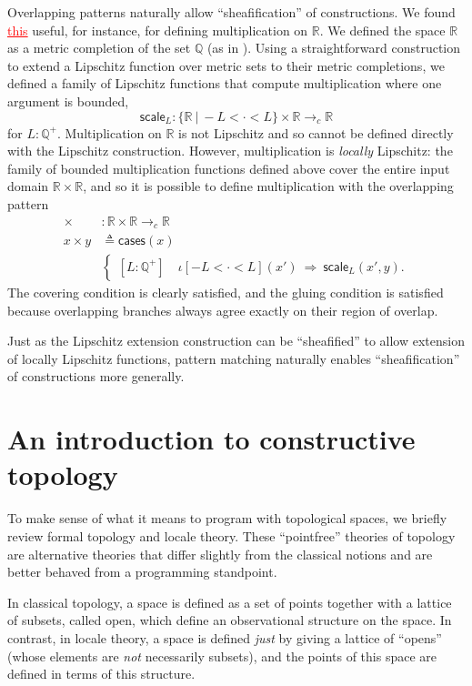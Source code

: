 \documentclass[conference]{IEEEtran}
\newcommand{\cto}{\to_c}
\newcommand{\R}{\mathbb{R}}
\newcommand{\rat}{\mathbb{Q}}
\newcommand{\suchthat}{\ |\ }
\newcommand{\oinclf}[1]{\iota[{#1}]}
\newcommand{\oincl}[2]{\oinclf{#1} \left({#2}\right)}
\newcommand{\Branch}{\Rightarrow}
\newcommand{\grammar}[1]{\textcolor{red}{\underline{#1}}}
\begin{document}
Overlapping patterns naturally allow ``sheafification'' of constructions. We found \grammar{this} useful, for instance, for defining multiplication on $\R$. We defined the space $\R$ as a metric completion of the set $\rat$ (as in \cite{vickersmetric}). Using a straightforward construction to extend  a Lipschitz function over metric sets to their metric completions, we defined a family of Lipschitz functions that compute multiplication where one argument is bounded,
\[
\mathsf{scale}_L : \{ \R \suchthat -L < \cdot < L \} \times \R \cto \R
\]
for $L : \rat^+$. Multiplication on $\R$ is not Lipschitz and so cannot be defined directly with the Lipschitz construction. However, multiplication is \emph{locally} Lipschitz: the family of bounded multiplication functions defined above cover the entire input domain $\R \times \R$, and so it is possible to define multiplication with the overlapping pattern
\begin{align*}
\times &: \R \times \R \cto \R
\\ x \times y &\triangleq
\mathsf{cases}(x)
\\
&\begin{cases}
[L : \rat^+] \quad \oincl{-L < \cdot < L}{x'}  \  \Branch \  \mathsf{scale}_L(x', y).
\end{cases}
\end{align*}
The covering condition is clearly satisfied, and the gluing condition is satisfied because overlapping branches always agree exactly on their region of overlap.

Just as the Lipschitz extension construction can be ``sheafified'' to allow extension of locally Lipschitz functions, pattern matching naturally enables ``sheafification'' of constructions more generally.

\section{An introduction to constructive topology}
\label{s:topology}

To make sense of what it means to program with topological spaces, we briefly review formal topology and locale theory. These ``pointfree'' theories of topology are alternative theories that differ slightly from the classical notions and are better behaved from a programming standpoint.

In classical topology, a space is defined as a set of points together with a lattice of subsets, called open, which define an observational structure on the space. In contrast, in locale theory, a space is defined \emph{just} by giving a lattice of ``opens'' (whose elements are \emph{not} necessarily subsets), and the points of this space are defined in terms of this structure.
\end{document}
